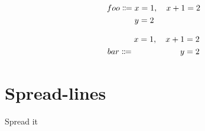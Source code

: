 \documentclass{article}
\begin{document}
\begin{equation}
foo\Coloneqq\begin{lgathered}[t]
x=1,\quad x+1=2 \\
y=2
\end{lgathered}
\end{equation}

\begin{equation}
bar\Coloneqq\begin{rgathered}[b]
x=1,\quad x+1=2 \\
y=2
\end{rgathered}
\end{equation}

\section{Spread-lines}
Spread it
\end{document}
